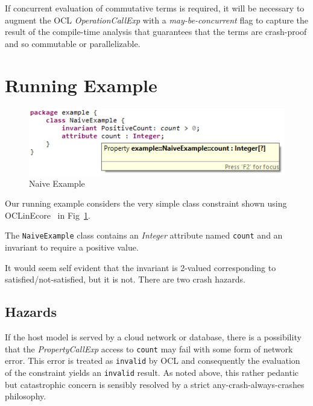 \documentclass[
]{ceurart}
\begin{document}
If concurrent evaluation of commutative terms is required, it will be necessary to augment the OCL \emph{OperationCallExp} with a \emph{may-be-concurrent} flag to capture the result of the compile-time analysis that guarantees that the terms are crash-proof and so commutable or parallelizable. 
 
\section{Running Example}\label{Running Example}

\begin{figure}
	\vspace{-10pt}
	\begin{center}
		\includegraphics[width=5.0in]{NaiveExample.png}
	\end{center}
	\vspace{-10pt}
	\caption{Naive Example}
	\label{fig:NaiveExample}
	\vspace{-10pt}
\end{figure}

Our running example considers the very simple class constraint shown using OCLinEcore~\cite{OCLinEcore} in Fig~\ref{fig:NaiveExample}.

The \verb|NaiveExample| class contains an \emph{Integer} attribute named \verb|count| and an invariant to require a positive value.

It would seem self evident that the invariant is 2-valued corresponding to satisfied/not-satisfied, but it is not. There are two crash hazards.

\subsection{Hazards}

If the host model is served by a cloud network or database, there is a possibility that the \emph{PropertyCallExp} access to \verb|count| may fail with some form of network error. This error is treated as \verb|invalid| by OCL and consequently the evaluation of the constraint yields an \verb|invalid| result. As noted above, this rather pedantic but catastrophic concern is sensibly resolved by a strict any-crash-always-crashes philosophy.
\end{document}
